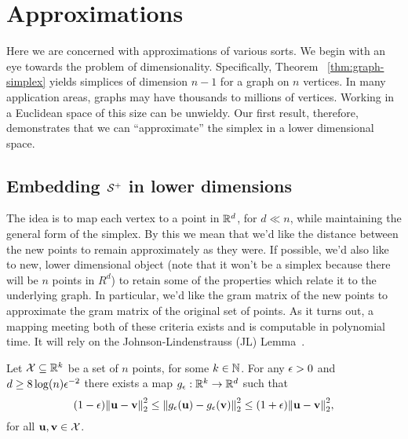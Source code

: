 \section{Approximations} 
\label{sec:algorithmics_approximations}
Here we are concerned  with  approximations of various sorts. We begin  with an eye towards the problem of  dimensionality. Specifically, Theorem ~\ref{thm:graph-simplex} yields simplices of dimension $n-1$ for a graph on $n$ vertices. In  many application areas, graphs may have thousands  to  millions of vertices. Working in a Euclidean space  of  this  size can be unwieldy. Our  first  result, therefore, demonstrates that we can ``approximate'' the simplex in a lower dimensional space. 

\subsection{Embedding \texorpdfstring{$\mathcal{S}^+$}{the inverse simplex} in lower dimensions}
\label{sec:algorithmics_JL}
The idea is to  map each vertex to a  point in $\mathbb{R}^d$, for $d\ll n$, while maintaining the general form of the simplex. By this we mean that we'd like the distance between the new  points  to remain approximately  as they  were. If possible, we'd also  like to new, lower  dimensional  object (note that it won't  be  a simplex because there will  be  $n$ points in $ R^d$) to retain some of the properties which  relate it  to the underlying graph. In  particular, we'd like the gram matrix  of the new  points to  approximate the gram  matrix of the original  set  of points. As it turns out,  a  mapping meeting both  of these criteria exists and is computable  in polynomial time. It will   rely on the Johnson-Lindenstrauss  (JL) Lemma~\cite{johnson1984extensions,dasgupta2003elementary}. 

\begin{theorem}
	Let $\mathcal{X}\subseteq \mathbb{R}^k$ be a set of $n$ points, for some $k\in\mathbb{N}$. For any $\epsilon>0$ and $d\geq 8\log(n)\epsilon^{-2}$ there exists a map $g_\epsilon:\mathbb{R}^k\to\mathbb{R}^d$ such that 
	\begin{equation*}
	(1-\epsilon)\norm{\vb{u}-\vb{v}}_2^2 \leq \norm{g_\epsilon(\vb{u}) - g_\epsilon(\vb{v})}_2^2 \leq (1+\epsilon)\norm{\vb{u}-\vb{v}}_2^2,
	\end{equation*}
	for all $\vb{u},\vb{v}\in \mathcal{X}$. 
\end{theorem}



